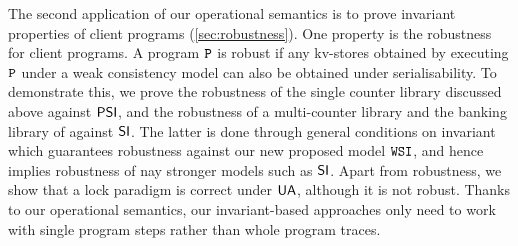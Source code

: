 The second application of our operational semantics is to prove
invariant properties of client programs (\cref{sec:robustness}).
One property is the robustness for client programs.
A program \(\mathtt{P}\) is robust if any kv-stores obtained 
by executing \(\mathtt{P}\) under a weak consistency model can also be obtained under serialisability.
To demonstrate this, we prove the robustness of the single
counter library discussed above against \(\mathsf{PSI}\), 
and the robustness of a multi-counter library and the banking library of \citet{bank-example-wsi}
against \(\mathsf{SI}\).
The latter is done through general conditions on invariant
which guarantees robustness against our new proposed model \( \mathtt{WSI} \),
and hence implies robustness of nay stronger models such as  \( \mathsf{SI} \).
Apart from robustness,
we show that a lock paradigm is correct under \( \mathsf{UA} \), 
although it is not robust.
Thanks to our operational semantics, 
our invariant-based approaches only need to work with single program steps 
rather than whole program traces.
